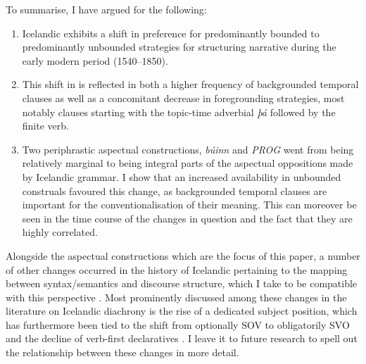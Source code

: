 \documentclass[output=paper,colorlinks,citecolor=brown]{langscibook}
\begin{document}
To summarise, I have argued for the following:
\begin{enumerate}
    \item Icelandic exhibits a shift in preference for predominantly bounded to predominantly unbounded strategies for structuring narrative during the early modern period (1540--1850).
    \item This shift in  is reflected in both a higher frequency of backgrounded temporal clauses as well as a concomitant decrease in foregrounding strategies, most notably clauses starting with the topic-time adverbial \textit{þá} followed by the finite verb.
    \item Two periphrastic aspectual constructions, \textit{búinn} and \textit{PROG} went from being relatively marginal to being integral parts of the aspectual oppositions made by Icelandic grammar. I show that an increased availability in unbounded construals favoured this change, as backgrounded temporal clauses are important for the conventionalisation of their meaning. This can moreover be seen in the time course of the changes in question and the fact that they are highly correlated.
\end{enumerate}

Alongside the aspectual constructions which are the focus of this paper, a number of other changes occurred in the history of Icelandic pertaining to the mapping between syntax/semantics and discourse structure, which I take to be compatible with this perspective \citep{booth_revisiting_2021}. Most prominently discussed among these
changes in the literature on Icelandic diachrony is the rise of a dedicated subject position, which has furthermore been tied to the shift from optionally SOV to obligatorily SVO \citep{rognvaldsson1996word, hroarsdottir2000word} and the decline of verb-first declaratives \citep{booth-beck20200jhs}. I leave it to future research to spell out the relationship between these changes in more detail.
\end{document}

